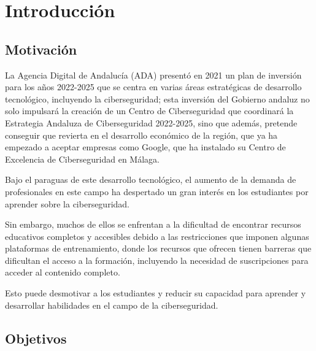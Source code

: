 \chapter{Introducción}

    \section{Motivación}
    
        
        La Agencia Digital de Andalucía (ADA) presentó en 2021 un plan de inversión para los años 2022-2025 que se centra en varias áreas estratégicas de desarrollo tecnológico, incluyendo la ciberseguridad; esta inversión del Gobierno andaluz no solo impulsará la creación de un Centro de Ciberseguridad que coordinará la Estrategia Andaluza de Ciberseguridad 2022-2025, sino que además, pretende conseguir que revierta en el desarrollo económico de la región, que ya ha empezado a aceptar empresas como Google, que ha instalado su Centro de Excelencia de Ciberseguridad en Málaga.
        
        Bajo el paraguas de este desarrollo tecnológico, el aumento de la demanda de profesionales en este campo ha despertado un gran interés en los estudiantes por aprender sobre la ciberseguridad.
        
        Sin embargo, muchos de ellos se enfrentan a la dificultad de encontrar recursos educativos completos y accesibles debido a las restricciones que imponen algunas plataformas de entrenamiento, donde los recursos que ofrecen tienen barreras que dificultan el acceso a la formación, incluyendo la necesidad de suscripciones para acceder al contenido completo.
        
        Esto puede desmotivar a los estudiantes y reducir su capacidad para aprender y desarrollar habilidades en el campo de la ciberseguridad.
    
    
    \section{Objetivos}
    
